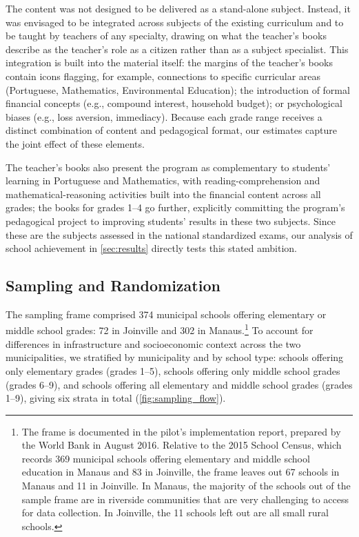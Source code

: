 The content was not designed to be delivered as a stand-alone subject. Instead, it was envisaged to be integrated across subjects of the existing curriculum and to be taught by teachers of any specialty, drawing on what the teacher's books describe as the teacher's role as a citizen rather than as a subject specialist. This integration is built into the material itself: the margins of the teacher's books contain icons flagging, for example, connections to specific curricular areas (Portuguese, Mathematics, Environmental Education); the introduction of formal financial concepts (e.g., compound interest, household budget); or psychological biases (e.g., loss aversion, immediacy). Because each grade range receives a distinct combination of content and pedagogical format, our estimates capture the joint effect of these elements.

The teacher's books also present the program as complementary to students' learning in Portuguese and Mathematics, with reading-comprehension and mathematical-reasoning activities built into the financial content across all grades; the books for grades 1--4 go further, explicitly committing the program's pedagogical project to improving students' results in these two subjects. Since these are the subjects assessed in the national standardized exams, our analysis of school achievement in \autoref{sec:results} directly tests this stated ambition. 


\subsection{Sampling and Randomization}\label{subsec:sample}

The sampling frame comprised 374 municipal schools offering elementary or middle school grades: 72 in Joinville and 302 in Manaus.\footnote{The frame is documented in the pilot's implementation report, prepared by the World Bank in August 2016. Relative to the 2015 School Census, which records 369 municipal schools offering elementary and middle school education in Manaus and 83 in Joinville, the frame leaves out 67 schools in Manaus and 11 in Joinville. In Manaus, the majority of the schools out of the sample frame are in riverside communities that are very challenging to access for data collection. In Joinville, the 11 schools left out are all small rural schools.} To account for differences in infrastructure and socioeconomic context across the two municipalities, we stratified by municipality and by school type: schools offering only elementary grades (grades 1--5), schools offering only middle school grades (grades 6--9), and schools offering all elementary and middle school grades (grades 1--9), giving six strata in total (\autoref{fig:sampling_flow}).

